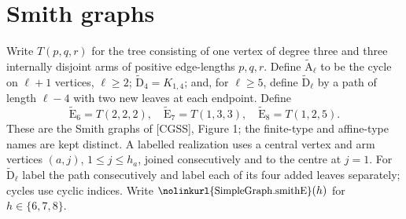 \documentclass[11pt]{amsart}
\theoremstyle{definition}
\newcommand{\code}[1]{\ifmmode\text{\small\nolinkurl{#1}}\else{\small\nolinkurl{#1}}\fi}
\begin{document}
\section{Smith graphs}

\begin{definition}\label{def:smith-models}
\uses{}
\mbox{}\par\nobreak
{}
Write $T(p,q,r)$ for the tree consisting of one vertex of degree three
and three internally disjoint arms of positive edge-lengths $p,q,r$.
Define $\widetilde{\mathrm A}_{\ell}$ to be the cycle on $\ell+1$
vertices, $\ell\ge2$; $\widetilde{\mathrm D}_4=K_{1,4}$; and, for
$\ell\ge5$, define $\widetilde{\mathrm D}_{\ell}$ by a path of length
$\ell-4$ with two new leaves at each endpoint. Define
\[
 \widetilde{\mathrm E}_6=T(2,2,2),\quad
 \widetilde{\mathrm E}_7=T(1,3,3),\quad
 \widetilde{\mathrm E}_8=T(1,2,5).
\]
These are the Smith graphs of [CGSS], Figure 1; the finite-type and
affine-type names are kept distinct.
A labelled realization uses a central vertex and arm vertices $(a,j)$,
$1\le j\le h_a$, joined consecutively and to the centre at $j=1$.
For $\widetilde{\mathrm D}_\ell$ label the path consecutively and label
each of its four added leaves separately; cycles use cyclic indices.
Write $\code{SimpleGraph.smithE}(h)$ for $h\in\{6,7,8\}$.
\end{definition}
\end{document}
